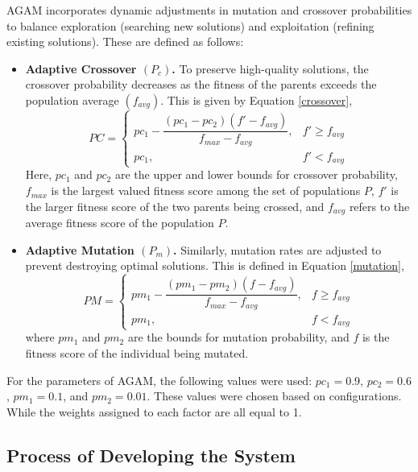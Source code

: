 AGAM incorporates dynamic adjustments in mutation and crossover probabilities to balance exploration (searching new solutions) and exploitation (refining existing solutions). These are defined as follows:
\begin{itemize}
    \item \textbf{Adaptive Crossover $ ( P _{c} )$.} To preserve high-quality solutions, the crossover probability decreases as the fitness of the parents exceeds the population average $ ( f _{avg} )$. This is given by Equation \ref{crossover},
    \begin{equation}
        \label{crossover}
        PC = \begin{cases}
            pc_1 - \dfrac{(pc_1 - pc_2)(f' - f_{avg})}{f_{max} - f_{avg}}, & f' \ge f_{avg} \\
            pc_1, & f' < f_{avg}
        \end{cases}
    \end{equation}
    Here, $pc_1$ and $pc_2$ are the upper and lower bounds for crossover probability, $f_{max}$ is the largest valued fitness score among the set of populations $P$, $f'$ is the larger fitness score of the two parents being crossed, and $f_{avg}$ refers to the average fitness score of the population $P$. 

    \item \textbf{Adaptive Mutation $ ( P _{m} )$.} Similarly, mutation rates are adjusted to prevent destroying optimal solutions. This is defined in Equation \ref{mutation},
    \begin{equation}
        \label{mutation}
        PM = \begin{cases}
            pm_1 - \dfrac{(pm_1 - pm_2)(f - f_{avg})}{f_{max} - f_{avg}}, & f \ge f_{avg} \\
            pm_1, & f < f_{avg}
        \end{cases}
    \end{equation}
    where $pm_1$ and $pm_2$  are the bounds for mutation probability, and $f$ is the fitness score of the individual being mutated.
\end{itemize}

For the parameters of AGAM, the following values were used: $pc_1 = 0.9$, $pc_2 = 0.6$, $pm_1 = 0.1$, and $pm_2 = 0.01$. These values were chosen based on \textcite{Yochum2020} configurations. While the weights assigned to each factor are all equal to 1.

\subsection{Process of Developing the System}


